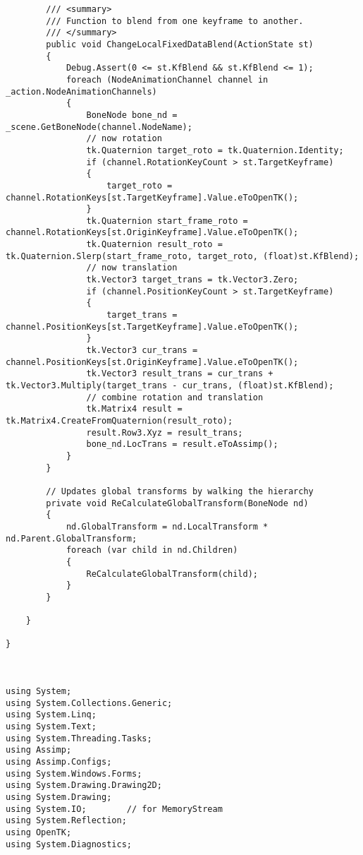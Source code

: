 \begin{scriptsize}
\begin{verbatim}
        /// <summary>
        /// Function to blend from one keyframe to another.
        /// </summary>
        public void ChangeLocalFixedDataBlend(ActionState st)
        {
            Debug.Assert(0 <= st.KfBlend && st.KfBlend <= 1);
            foreach (NodeAnimationChannel channel in _action.NodeAnimationChannels)
            {
                BoneNode bone_nd = _scene.GetBoneNode(channel.NodeName);
                // now rotation
                tk.Quaternion target_roto = tk.Quaternion.Identity;
                if (channel.RotationKeyCount > st.TargetKeyframe)
                {
                    target_roto = channel.RotationKeys[st.TargetKeyframe].Value.eToOpenTK();
                }
                tk.Quaternion start_frame_roto = channel.RotationKeys[st.OriginKeyframe].Value.eToOpenTK();
                tk.Quaternion result_roto = tk.Quaternion.Slerp(start_frame_roto, target_roto, (float)st.KfBlend);
                // now translation
                tk.Vector3 target_trans = tk.Vector3.Zero;
                if (channel.PositionKeyCount > st.TargetKeyframe)
                {
                    target_trans = channel.PositionKeys[st.TargetKeyframe].Value.eToOpenTK();
                }
                tk.Vector3 cur_trans = channel.PositionKeys[st.OriginKeyframe].Value.eToOpenTK();
                tk.Vector3 result_trans = cur_trans + tk.Vector3.Multiply(target_trans - cur_trans, (float)st.KfBlend);
                // combine rotation and translation
                tk.Matrix4 result = tk.Matrix4.CreateFromQuaternion(result_roto);
                result.Row3.Xyz = result_trans;
                bone_nd.LocTrans = result.eToAssimp();
            }
        }

        // Updates global transforms by walking the hierarchy 
        private void ReCalculateGlobalTransform(BoneNode nd)
        {
            nd.GlobalTransform = nd.LocalTransform * nd.Parent.GlobalTransform;
            foreach (var child in nd.Children)
            {
                ReCalculateGlobalTransform(child);
            }
        }

    }

}



using System;
using System.Collections.Generic;
using System.Linq;
using System.Text;
using System.Threading.Tasks;
using Assimp;
using Assimp.Configs;
using System.Windows.Forms;
using System.Drawing.Drawing2D;
using System.Drawing;
using System.IO;        // for MemoryStream
using System.Reflection;
using OpenTK;
using System.Diagnostics;



\end{verbatim}
\end{scriptsize}
